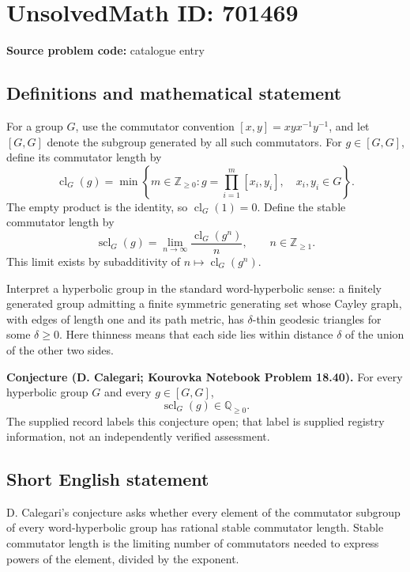 \documentclass[11pt]{article}
\begin{document}
\section*{UnsolvedMath ID: 701469}
\textbf{Source problem code:} catalogue entry
\subsection{Definitions and mathematical statement}
For a group \(G\), use the commutator convention \([x,y]=xyx^{-1}y^{-1}\), and let \([G,G]\) denote the subgroup generated by all such commutators. For \(g\in[G,G]\), define its commutator length by
\[
\operatorname{cl}_G(g)=\min\left\{m\in\mathbb Z_{\geq0}:g=\prod_{i=1}^{m}[x_i,y_i],\quad x_i,y_i\in G\right\}.
\]
The empty product is the identity, so \(\operatorname{cl}_G(1)=0\). Define the stable commutator length by
\[
\operatorname{scl}_G(g)=\lim_{n\to\infty}\frac{\operatorname{cl}_G(g^n)}{n},\qquad n\in\mathbb Z_{\geq1}.
\]
This limit exists by subadditivity of \(n\mapsto\operatorname{cl}_G(g^n)\).

Interpret a hyperbolic group in the standard word-hyperbolic sense: a finitely generated group admitting a finite symmetric generating set whose Cayley graph, with edges of length one and its path metric, has \(\delta\)-thin geodesic triangles for some \(\delta\geq0\). Here thinness means that each side lies within distance \(\delta\) of the union of the other two sides.

\textbf{Conjecture (D. Calegari; Kourovka Notebook Problem 18.40).} For every hyperbolic group \(G\) and every \(g\in[G,G]\),
\[
\operatorname{scl}_G(g)\in\mathbb Q_{\geq0}.
\]
The supplied record labels this conjecture open; that label is supplied registry information, not an independently verified assessment.
\subsection{Short English statement}
D. Calegari's conjecture asks whether every element of the commutator subgroup of every word-hyperbolic group has rational stable commutator length. Stable commutator length is the limiting number of commutators needed to express powers of the element, divided by the exponent.
\end{document}
